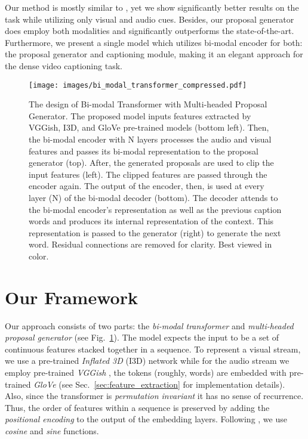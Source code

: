 \documentclass{src/bmvc2k}
\begin{document}
Our method is mostly similar to \cite{mdvc_Iashin_2020}, yet we show significantly better results on the task while utilizing only visual and audio cues. Besides, our proposal generator does employ both modalities and significantly outperforms the state-of-the-art. Furthermore, we present a single model which utilizes bi-modal encoder for both: the proposal generator and captioning module, making it an elegant approach for the dense video captioning task.

\begin{figure}
\begin{center}
\texttt{[image: images/bi\_modal\_transformer\_compressed.pdf]}
\end{center}
\vspace{-1.5em}
\caption{\small The design of Bi-modal Transformer with Multi-headed Proposal Generator. The proposed model inputs features extracted by VGGish, I3D, and GloVe pre-trained models (bottom left). Then, the bi-modal encoder with N layers processes the audio and visual features and passes its bi-modal representation to the proposal generator (top). After, the generated proposals are used to clip the input features (left). The clipped features are passed through the encoder again. The output of the encoder, then, is used at every layer (N) of the bi-modal decoder (bottom). The decoder attends to the bi-modal encoder's representation as well as the previous caption words and produces its internal representation of the context. This representation is passed to the generator (right) to generate the next word. Residual connections are removed for clarity. Best viewed in color. \label{fig:bi_modal_transformer}}
\end{figure}



\section{Our Framework}

Our approach consists of two parts: the \textit{bi-modal transformer} and \textit{multi-headed proposal generator} (see Fig.~\ref{fig:bi_modal_transformer}). The model expects the input to be a set of continuous features stacked together in a sequence. To represent a visual stream, we use a pre-trained \textit{Inflated 3D} (I3D) network \cite{i3d_Carreira_2017} while for the audio stream we employ pre-trained \textit{VGGish} \cite{Hershey2017}, the tokens (roughly, words) are embedded with pre-trained \textit{GloVe} \cite{Glove_Pennington_2014} (see Sec.~\ref{sec:feature_extraction} for implementation details). Also, since the transformer is \textit{permutation invariant} it has no sense of recurrence. Thus, the order of features within a sequence is preserved by adding the \textit{positional encoding} to the output of the embedding layers. Following \cite{transformer_Vaswani2017}, we use \textit{cosine} and \textit{sine} functions.
\end{document}
